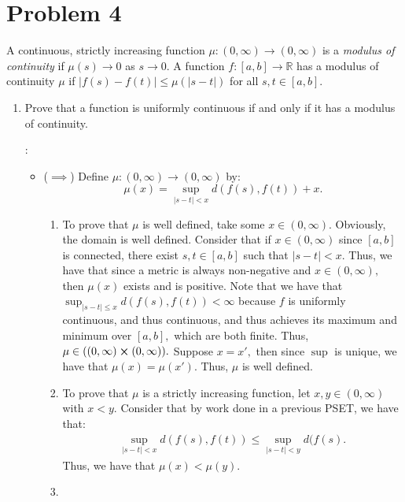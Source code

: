 \documentclass[11pt]{article}
\newcommand{\bbR}{\mathbb{R}}
\begin{document}
\section*{Problem 4}
\begin{problem}
    A continuous, strictly increasing function $\mu: (0,\infty) \to (0,\infty)$ is a \textit{modulus of continuity} if $\mu(s) \to 0$ as $s \to 0.$ A function $f:[a,b]\to \bbR$ has a modulus of continuity $\mu$ if $|f(s) - f(t)|\leq \mu(|s-t|)$ for all $s,t \in [a,b].$
\end{problem}
\begin{enumerate}
    \item 
    \begin{problem}
    Prove that a function is uniformly continuous if and only if it has a modulus of continuity.        
    \end{problem}
    \begin{solution}:\\
        \begin{itemize}
            \item ($\implies$)  Define $\mu:(0,\infty) \to (0, \infty)$ by:
            \[\mu(x) = 
                \sup\limits_{|s-t|<x}d(f(s), f(t)) + x.\]
            \begin{enumerate}
                \item To prove that $\mu$ is well defined, take some $x \in (0,\infty).$ Obviously, the domain is well defined. Consider that if $x\in (0,\infty)$ since $[a,b]$ is connected, there exist $s,t \in [a,b]$ such that $|s-t|< x.$ Thus, we have that since a metric is always non-negative and $x\in (0,\infty),$ then $\mu(x)$ exists and is positive. Note that we have that $\sup_{|s-t|\leq x}d(f(s), f(t))< \infty$ because $f$ is uniformly continuous, and thus continuous, and thus achieves its maximum and minimum over $[a,b],$ which are both finite. Thus, $\mu \in ((0,\infty) \cross (0,\infty)).$ Suppose $x = x',$ then since $\sup$ is unique, we have that $\mu(x) = \mu(x').$ Thus, $\mu$ is well defined.  
                \item To prove that $\mu$ is a strictly increasing function, let $x,y \in (0,\infty)$ with $x<y.$ Consider that by work done in a previous PSET, we have that:
                \begin{align}
                    \sup_{|s-t|< x}d(f(s), f(t)) \leq \sup_{|s-t|<y}d(f(s).
                \end{align} 
                Thus, we have that $\mu(x)< \mu(y).$
            \item 

\end{enumerate}
\end{itemize}
\end{solution}
\end{enumerate}
\end{document}
